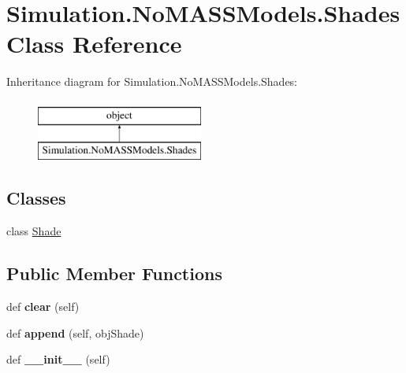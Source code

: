 \hypertarget{class_c_simulation_1_1_simulation_1_1_no_m_a_s_s_models_1_1_shades}{}\section{Simulation.\+No\+M\+A\+S\+S\+Models.\+Shades Class Reference}
\label{class_c_simulation_1_1_simulation_1_1_no_m_a_s_s_models_1_1_shades}
Inheritance diagram for Simulation.\+No\+M\+A\+S\+S\+Models.\+Shades\+:\begin{figure}[H]
\begin{center}
\leavevmode
\includegraphics[height=2.000000cm]{class_c_simulation_1_1_simulation_1_1_no_m_a_s_s_models_1_1_shades}
\end{center}
\end{figure}
\subsection*{Classes}
\begin{DoxyCompactItemize}
\item 
class \hyperlink{class_c_simulation_1_1_simulation_1_1_no_m_a_s_s_models_1_1_shades_1_1_shade}{Shade}
\end{DoxyCompactItemize}
\subsection*{Public Member Functions}
\begin{DoxyCompactItemize}
\item 
\mbox{\label{class_c_simulation_1_1_simulation_1_1_no_m_a_s_s_models_1_1_shades_ad149341d7d849ff957baee565b19c123}} 
def {\bfseries clear} (self)
\item 
\mbox{\label{class_c_simulation_1_1_simulation_1_1_no_m_a_s_s_models_1_1_shades_afeb95331c52b9ae001dbeacd1b58218f}} 
def {\bfseries append} (self, obj\+Shade)
\item 
\mbox{\label{class_c_simulation_1_1_simulation_1_1_no_m_a_s_s_models_1_1_shades_ae64f0875afe3067b97ba370b354b9213}} 
def {\bfseries \+\_\+\+\_\+init\+\_\+\+\_\+} (self)
\end{DoxyCompactItemize}
